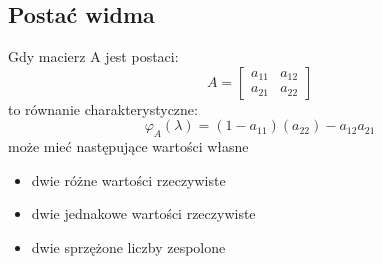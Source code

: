 \documentclass[]{article}
\begin{document}
\subsection{Postać widma}
Gdy macierz A jest postaci:
\[ A = \begin{bmatrix} a_{11} & a_{12} \\ a_{21} & a_{22} \end{bmatrix} \]
to równanie charakterystyczne:
\[ \varphi_A(\lambda) = (1-a_{11})(a_{22}) -a_{12}a_{21} \]
może mieć następujące wartości własne
\begin{itemize}
	\item dwie różne wartości rzeczywiste
	\item dwie jednakowe wartości rzeczywiste
	\item dwie sprzężone liczby zespolone
\end{itemize}
\end{document}
